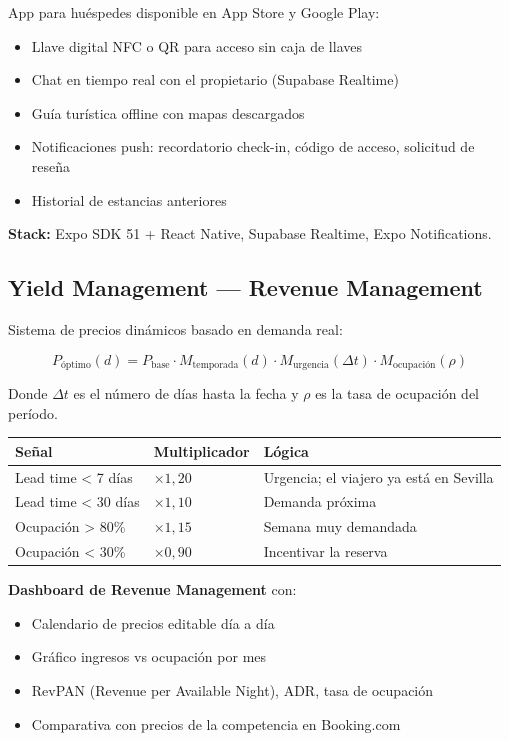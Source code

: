 \documentclass[12pt,a4paper,twoside,openright]{report}
\begin{document}
App para huéspedes disponible en App Store y Google Play:

\begin{itemize}
  \item Llave digital NFC o QR para acceso sin caja de llaves
  \item Chat en tiempo real con el propietario (Supabase Realtime)
  \item Guía turística offline con mapas descargados
  \item Notificaciones push: recordatorio check-in, código de acceso, solicitud de reseña
  \item Historial de estancias anteriores
\end{itemize}

\textbf{Stack:} Expo SDK 51 + React Native, Supabase Realtime, Expo Notifications.

\subsection{Yield Management — Revenue Management}

Sistema de precios dinámicos basado en demanda real:

\begin{equation}
  P_{\text{óptimo}}(d) = P_{\text{base}} \cdot M_{\text{temporada}}(d)
    \cdot M_{\text{urgencia}}(\Delta t) \cdot M_{\text{ocupación}}(\rho)
\end{equation}

Donde $\Delta t$ es el número de días hasta la fecha y $\rho$ es la tasa de
ocupación del período.

\begin{longtable}{L{4cm} C{3cm} L{5.5cm}}
  \toprule
  \textbf{Señal} & \textbf{Multiplicador} & \textbf{Lógica} \\
  \midrule
  Lead time < 7 días & $\times 1{,}20$ & Urgencia; el viajero ya está en Sevilla \\
  Lead time < 30 días & $\times 1{,}10$ & Demanda próxima \\
  Ocupación > 80\% & $\times 1{,}15$ & Semana muy demandada \\
  Ocupación < 30\% & $\times 0{,}90$ & Incentivar la reserva \\
  \bottomrule
\end{longtable}

\textbf{Dashboard de Revenue Management} con:
\begin{itemize}
  \item Calendario de precios editable día a día
  \item Gráfico ingresos vs ocupación por mes
  \item RevPAN (Revenue per Available Night), ADR, tasa de ocupación
  \item Comparativa con precios de la competencia en Booking.com
\end{itemize}
\end{document}

